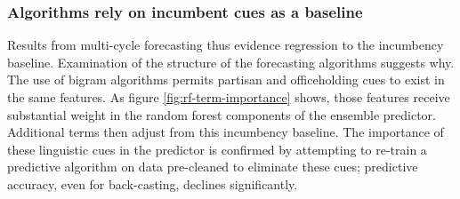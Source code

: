 \documentclass{article}
\begin{document}






\subsubsection{Algorithms rely on incumbent cues as a baseline}
\label{sec:algor-behav-perf}

Results from multi-cycle forecasting thus evidence regression to
the incumbency baseline. Examination of the structure of the
forecasting algorithms suggests why. The use of
bigram algorithms permits partisan and officeholding cues to exist in
the same features. As figure \ref{fig:rf-term-importance} shows, those
features receive substantial weight in the random forest components of
the ensemble predictor. Additional terms then adjust from this incumbency baseline. The
importance of these linguistic cues in the predictor is confirmed by
attempting to re-train a predictive algorithm on data pre-cleaned to
eliminate these cues; predictive accuracy, even for back-casting,
declines significantly.
\end{document}
